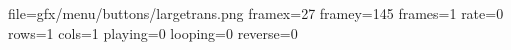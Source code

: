 file=gfx/menu/buttons/largetrans.png
framex=27
framey=145
frames=1
rate=0
rows=1
cols=1
playing=0
looping=0
reverse=0